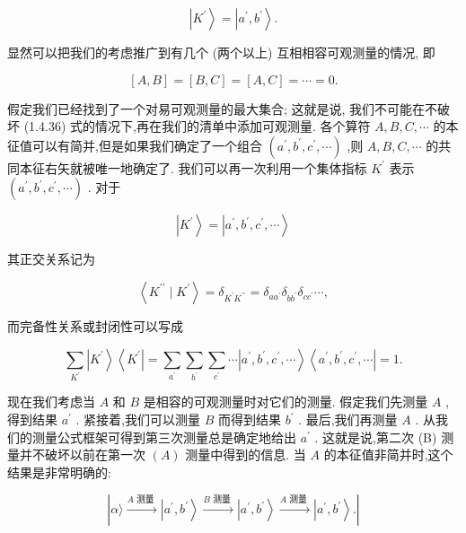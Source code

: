 \documentclass[lang=cn,newtx,10pt,scheme=chinese,thmcnt=section]{elegantbook}
\begin{document}
$$
\left| {K}^{\prime }\right\rangle = \left| {{a}^{\prime },{b}^{\prime }}\right\rangle . \tag{1. 4.35}
$$

显然可以把我们的考虑推广到有几个 (两个以上) 互相相容可观测量的情况, 即

$$
\left\lbrack {A, B}\right\rbrack = \left\lbrack {B, C}\right\rbrack = \left\lbrack {A, C}\right\rbrack = \cdots = 0. \tag{1. 4.36}
$$

假定我们已经找到了一个对易可观测量的最大集合; 这就是说, 我们不可能在不破坏 (1.4.36) 式的情况下,再在我们的清单中添加可观测量. 各个算符 $A, B, C,\cdots$ 的本征值可以有简并,但是如果我们确定了一个组合 $\left( {{a}^{\prime },{b}^{\prime },{c}^{\prime },\cdots }\right)$ ,则 $A, B, C,\cdots$ 的共同本征右矢就被唯一地确定了. 我们可以再一次利用一个集体指标 ${K}^{\prime }$ 表示 $\left( {{a}^{\prime },{b}^{\prime },{c}^{\prime },\cdots }\right)$ . 对于

$$
\left| {K}^{\prime }\right\rangle = \left| {{a}^{\prime },{b}^{\prime },{c}^{\prime },\cdots }\right\rangle \tag{1. 4.37}
$$

其正交关系记为

$$
\left\langle {{K}^{\prime \prime } \mid {K}^{\prime }}\right\rangle = {\delta }_{{K}^{\prime }{K}^{\prime \prime }} = {\delta }_{a{a}^{\prime }}{\delta }_{b{b}^{\prime }}{\delta }_{c{c}^{\prime }}\cdots , \tag{1. 4.38}
$$

而完备性关系或封闭性可以写成

$$
\mathop{\sum }\limits_{{K}^{\prime }}\left| {K}^{\prime }\right\rangle \left\langle {K}^{\prime }\right| = \mathop{\sum }\limits_{{a}^{\prime }}\mathop{\sum }\limits_{{b}^{\prime }}\mathop{\sum }\limits_{{c}^{\prime }}\cdots \left| {{a}^{\prime },{b}^{\prime },{c}^{\prime },\cdots }\right\rangle \left\langle {{a}^{\prime },{b}^{\prime },{c}^{\prime },\cdots }\right| = 1. \tag{1. 4.39}
$$

现在我们考虑当 $A$ 和 $B$ 是相容的可观测量时对它们的测量. 假定我们先测量 $A$ ,得到结果 ${a}^{\prime }$ . 紧接着,我们可以测量 $B$ 而得到结果 ${b}^{\prime }$ . 最后,我们再测量 $A$ . 从我们的测量公式框架可得到第三次测量总是确定地给出 ${a}^{\prime }$ . 这就是说,第二次 (B) 测量并不破坏以前在第一次 $\left( A\right)$ 测量中得到的信息. 当 $A$ 的本征值非简并时,这个结果是非常明确的:

$$
\left| {\alpha \rangle \xrightarrow[]{A\text{ 测量 }}\left| {{a}^{\prime },{b}^{\prime }}\right\rangle \xrightarrow[]{B\text{ 测量 }}\left| {{a}^{\prime },{b}^{\prime }}\right\rangle \xrightarrow[]{A\text{ 测量 }}\left| {{a}^{\prime },{b}^{\prime }}\right\rangle .}\right| \tag{1.4.40}
$$
\end{document}
